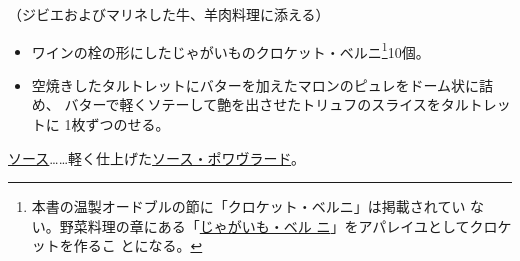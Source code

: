 \begin{recette}


（ジビエおよびマリネした牛、羊肉料理に添える）

\begin{itemize}
\item
  ワインの栓の形にしたじゃがいものクロケット・ベルニ\footnote{本書の温製オードブルの節に「クロケット・ベルニ」は掲載されてい
    ない。野菜料理の章にある「\protect\hyperlink{pommes-de-terre-berny}{じゃがいも・ベル
    ニ}」をアパレイユとしてクロケットを作るこ とになる。}10個。
\item
  空焼きしたタルトレットにバターを加えたマロンのピュレをドーム状に詰め、
  バターで軽くソテーして艶を出させたトリュフのスライスをタルトレットに
  1枚ずつのせる。
\end{itemize}

\ul{ソース}\ldots{}\ldots{}軽く仕上げた\protect\hyperlink{sauce-poivrade}{ソース・ポワヴラード}。
\end{recette}